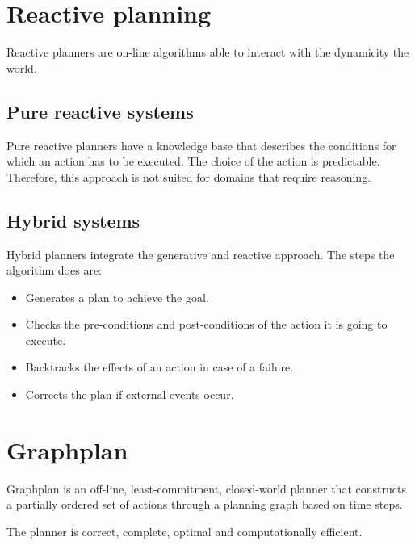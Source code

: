 \section{Reactive planning}
Reactive planners are on-line algorithms able to interact with the dynamicity the world.

\subsection{Pure reactive systems}
Pure reactive planners have a knowledge base that describes the conditions for which an action has to be executed.
The choice of the action is predictable. Therefore, this approach is not suited for domains that require reasoning.

\subsection{Hybrid systems}
Hybrid planners integrate the generative and reactive approach.
The steps the algorithm does are:
\begin{itemize}
    \item Generates a plan to achieve the goal.
    \item Checks the pre-conditions and post-conditions of the action it is going to execute.
    \item Backtracks the effects of an action in case of a failure.
    \item Corrects the plan if external events occur.
\end{itemize}



\section{Graphplan}
Graphplan is an off-line, least-commitment, closed-world planner that
constructs a partially ordered set of actions through a planning graph based on time steps.

The planner is correct, complete, optimal and computationally efficient.


